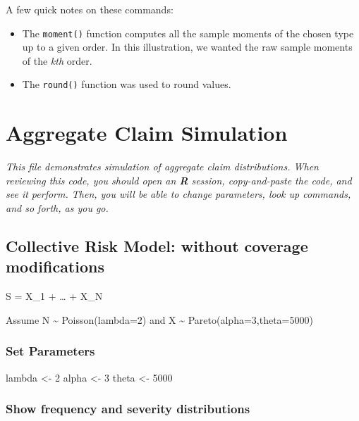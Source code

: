 \documentclass[]{book}
\newenvironment{Shaded}{\begin{snugshade}}{\end{snugshade}}
\newcommand{\DecValTok}[1]{\textcolor[rgb]{0.00,0.00,0.81}{#1}}
\newcommand{\StringTok}[1]{\textcolor[rgb]{0.31,0.60,0.02}{#1}}
\newcommand{\NormalTok}[1]{#1}
\providecommand{\tightlist}{%
  \setlength{\itemsep}{0pt}\setlength{\parskip}{0pt}}
\theoremstyle{definition}
\theoremstyle{definition}
\theoremstyle{definition}
\theoremstyle{remark}
\begin{document}
A few quick notes on these commands:

\begin{itemize}
\tightlist
\item
  The \texttt{moment()} function computes all the sample moments of the
  chosen type up to a given order. In this illustration, we wanted the
  raw sample moments of the \emph{kth} order.
\item
  The \texttt{round()} function was used to round values.
\end{itemize}

\chapter{Aggregate Claim Simulation}\label{aggregate-claim-simulation}

\emph{This file demonstrates simulation of aggregate claim
distributions. When reviewing this code, you should open an \textbf{R}
session, copy-and-paste the code, and see it perform. Then, you will be
able to change parameters, look up commands, and so forth, as you go.}

\section{Collective Risk Model: without coverage
modifications}\label{collective-risk-model-without-coverage-modifications}

S = X\_1 + \ldots{} + X\_N

Assume N \textasciitilde{} Poisson(lambda=2) and X \textasciitilde{}
Pareto(alpha=3,theta=5000)

\subsection{Set Parameters}\label{set-parameters}

\begin{Shaded}
\begin{Highlighting}[]
\NormalTok{lambda <-}\StringTok{ }\DecValTok{2}
\NormalTok{alpha <-}\StringTok{ }\DecValTok{3}
\NormalTok{theta <-}\StringTok{ }\DecValTok{5000}
\end{Highlighting}
\end{Shaded}

\subsection{Show frequency and severity
distributions}\label{show-frequency-and-severity-distributions}
\end{document}
